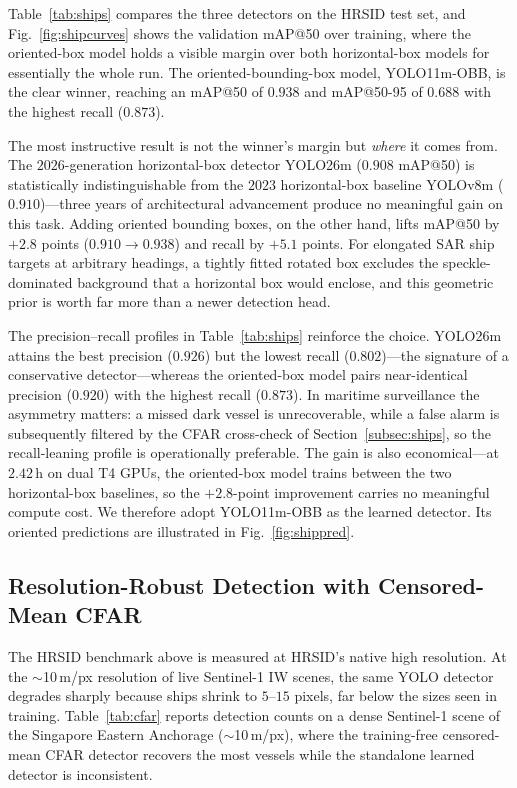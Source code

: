 \documentclass{ieeeaccess}
\begin{document}
Table~\ref{tab:ships} compares the three detectors on the HRSID test set, and Fig.~\ref{fig:shipcurves} shows the validation mAP@50 over training, where the oriented-box model holds a visible margin over both horizontal-box models for essentially the whole run. The oriented-bounding-box model, YOLO11m-OBB, is the clear winner, reaching an mAP@50 of $0.938$ and mAP@50-95 of $0.688$ with the highest recall ($0.873$).

The most instructive result is not the winner's margin but \emph{where} it comes from. The $2026$-generation horizontal-box detector YOLO26m ($0.908$ mAP@50) is statistically indistinguishable from the $2023$ horizontal-box baseline YOLOv8m ($0.910$)---three years of architectural advancement produce no meaningful gain on this task. Adding oriented bounding boxes, on the other hand, lifts mAP@50 by $+2.8$ points ($0.910\!\rightarrow\!0.938$) and recall by $+5.1$ points. For elongated SAR ship targets at arbitrary headings, a tightly fitted rotated box excludes the speckle-dominated background that a horizontal box would enclose, and this geometric prior is worth far more than a newer detection head.

The precision--recall profiles in Table~\ref{tab:ships} reinforce the choice. YOLO26m attains the best precision ($0.926$) but the lowest recall ($0.802$)---the signature of a conservative detector---whereas the oriented-box model pairs near-identical precision ($0.920$) with the highest recall ($0.873$). In maritime surveillance the asymmetry matters: a missed dark vessel is unrecoverable, while a false alarm is subsequently filtered by the CFAR cross-check of Section~\ref{subsec:ships}, so the recall-leaning profile is operationally preferable. The gain is also economical---at $2.42$\,h on dual T4 GPUs, the oriented-box model trains between the two horizontal-box baselines, so the $+2.8$-point improvement carries no meaningful compute cost. We therefore adopt YOLO11m-OBB as the learned detector. Its oriented predictions are illustrated in Fig.~\ref{fig:shippred}.

\subsection{Resolution-Robust Detection with Censored-Mean CFAR}

The HRSID benchmark above is measured at HRSID's native high resolution. At the $\sim$10\,m/px resolution of live Sentinel-1 IW scenes, the same YOLO detector degrades sharply because ships shrink to $5$--$15$ pixels, far below the sizes seen in training. Table~\ref{tab:cfar} reports detection counts on a dense Sentinel-1 scene of the Singapore Eastern Anchorage ($\sim$10\,m/px), where the training-free censored-mean CFAR detector recovers the most vessels while the standalone learned detector is inconsistent.
\end{document}
